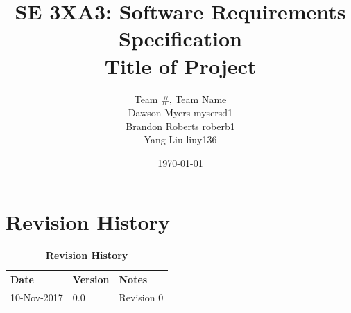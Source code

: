 \documentclass[12pt, titlepage]{article}
\title{SE 3XA3: Software Requirements Specification\\Title of Project}
\author{Team \#, Team Name
		\\ Dawson Myers mysersd1
		\\ Brandon Roberts roberb1
		\\ Yang Liu liuy136
}
\date{\today}
\newcommand{\revisionTable}{
	\begin{table}[hp]
		
		\begin{tabularx}{\textwidth}{p{3cm}p{2cm}X}
			\toprule {\bf Date} & {\bf Version} & {\bf Notes}\\
			\midrule
			
			10-Nov-2017 & 0.0 & Revision 0\\
			
			\bottomrule
		\end{tabularx}
		\caption{\bf Revision History}
	\end{table}
}
\begin{document}
%
%
%
%








\def\thesection{\arabic{section}} 
\renewcommand\thesection{\arabic{section}} 
\renewcommand\thesubsection{\thesection.\arabic{subsection}}

\tableofcontents

\listoftables

\listoffigures


\newpage

\section{Revision History}
\revisionTable


\end{document}
